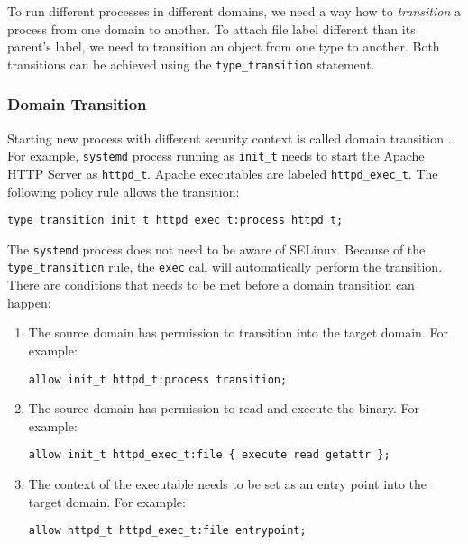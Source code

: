 To run different processes in different domains, we need a way how to
\emph{transition} a process from one domain to another. To attach file label
different than its parent's label, we need to transition an object from one type
to another. Both transitions can be achieved using the \texttt{type\_transition}
statement.

\subsubsection{Domain Transition}

Starting new process with different security context is called domain transition
\cite[pp.~43--47]{tsn}. For example, \texttt{systemd} process running as
\texttt{init\_t} needs to start the Apache HTTP Server as \texttt{httpd\_t}.
Apache executables are labeled \texttt{httpd\_exec\_t}. The following policy
rule allows the transition:
\begin{lstlisting}[language=te]
type_transition init_t httpd_exec_t:process httpd_t;
\end{lstlisting}
The \texttt{systemd} process does not need to be aware of SELinux. Because of
the \texttt{type\_transition} rule, the \texttt{exec} call will automatically
perform the transition. There are conditions that needs to be met before a
domain transition can happen:
\begin{enumerate}
    \item The source domain has permission to transition into the target domain.
        For example:
\begin{lstlisting}[language=te]
allow init_t httpd_t:process transition;
\end{lstlisting}
    \item The source domain has permission to read and execute the binary. For
        example:
\begin{lstlisting}[language=te]
allow init_t httpd_exec_t:file { execute read getattr };
\end{lstlisting}
    \item The context of the executable needs to be set as an entry point into
        the target domain. For example:
\begin{lstlisting}[language=te]
allow httpd_t httpd_exec_t:file entrypoint;
\end{lstlisting}
\end{enumerate}

